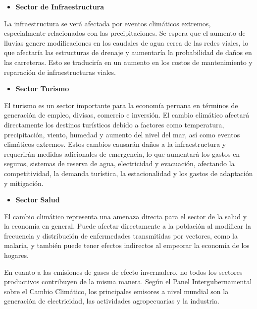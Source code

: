 \documentclass[
  letterpaper,
  DIV=11,
  numbers=noendperiod]{scrartcl}
\providecommand{\tightlist}{%
  \setlength{\itemsep}{0pt}\setlength{\parskip}{0pt}}\usepackage{longtable,booktabs,array}
\begin{document}
\begin{itemize}
\tightlist
\item
  \textbf{Sector de Infraestructura}
\end{itemize}

La infraestructura se verá afectada por eventos climáticos extremos,
especialmente relacionados con las precipitaciones. Se espera que el
aumento de lluvias genere modificaciones en los caudales de agua cerca
de las redes viales, lo que afectaría las estructuras de drenaje y
aumentaría la probabilidad de daños en las carreteras. Esto se
traduciría en un aumento en los costos de mantenimiento y reparación de
infraestructuras viales.

\begin{itemize}
\tightlist
\item
  \textbf{Sector Turismo}
\end{itemize}

El turismo es un sector importante para la economía peruana en términos
de generación de empleo, divisas, comercio e inversión. El cambio
climático afectará directamente los destinos turísticos debido a
factores como temperatura, precipitación, viento, humedad y aumento del
nivel del mar, así como eventos climáticos extremos. Estos cambios
causarán daños a la infraestructura y requerirán medidas adicionales de
emergencia, lo que aumentará los gastos en seguros, sistemas de reserva
de agua, electricidad y evacuación, afectando la competitividad, la
demanda turística, la estacionalidad y los gastos de adaptación y
mitigación.

\begin{itemize}
\tightlist
\item
  \textbf{Sector Salud}
\end{itemize}

El cambio climático representa una amenaza directa para el sector de la
salud y la economía en general. Puede afectar directamente a la
población al modificar la frecuencia y distribución de enfermedades
transmitidas por vectores, como la malaria, y también puede tener
efectos indirectos al empeorar la economía de los hogares.

En cuanto a las emisiones de gases de efecto invernadero, no todos los
sectores productivos contribuyen de la misma manera. Según el Panel
Intergubernamental sobre el Cambio Climático, los principales emisores a
nivel mundial son la generación de electricidad, las actividades
agropecuarias y la industria.
\end{document}
